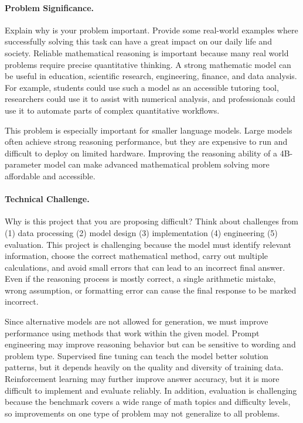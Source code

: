 \documentclass{article}
\begin{document}
\paragraph{Problem Significance.}
Explain  why is your problem important. Provide some real-world examples where successfully solving this task can have a great impact on our daily life and society. 
\hline
Reliable mathematical reasoning is important because many real world problems require precise quantitative thinking. A strong mathematic model can be useful in education, scientific research, engineering, finance, and data analysis. For example, students could use such a model as an accessible tutoring tool, researchers could use it to assist with numerical analysis, and professionals could use it to automate parts of complex quantitative workflows.

This problem is especially important for smaller language models. Large models often achieve strong reasoning performance, but they are expensive to run and difficult to deploy on limited hardware. Improving the reasoning ability of a 4B-parameter model can make advanced mathematical problem solving more affordable and accessible.

\paragraph{Technical Challenge.}
Why is this project that you are proposing difficult? Think about challenges from (1) data processing (2) model design (3) implementation (4) engineering (5) evaluation. 
\hline
This project is challenging because the model must identify relevant information, choose the correct mathematical method, carry out multiple calculations, and avoid small errors that can lead to an incorrect final answer. Even if the reasoning process is mostly correct, a single arithmetic mistake, wrong assumption, or formatting error can cause the final response to be marked incorrect.

Since alternative models are not allowed for generation, we must improve performance using methods that work within the given model. Prompt engineering may improve reasoning behavior but can be sensitive to wording and problem type. Supervised fine tuning can teach the model better solution patterns, but it depends heavily on the quality and diversity of training data. Reinforcement learning may further improve answer accuracy, but it is more difficult to implement and evaluate reliably. In addition, evaluation is challenging because the benchmark covers a wide range of math topics and difficulty levels, so improvements on one type of problem may not generalize to all problems.
\end{document}
